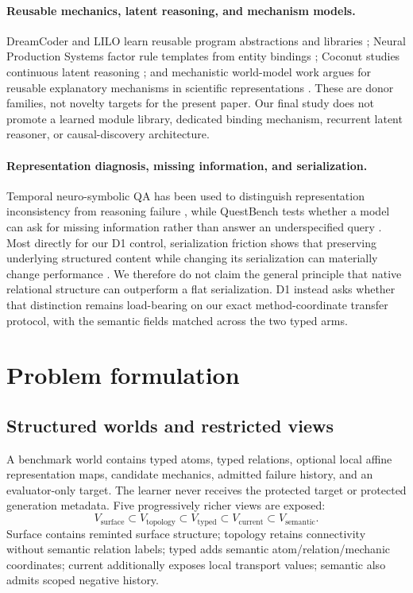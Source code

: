 \documentclass[10pt]{article}
\begin{document}
\paragraph{Reusable mechanics, latent reasoning, and mechanism models.}
DreamCoder and LILO learn reusable program abstractions and libraries \citep{ellis2020dreamcoder,grand2023lilo}; Neural Production Systems factor rule templates from entity bindings \citep{goyal2021nps}; Coconut studies continuous latent reasoning \citep{hao2024coconut}; and mechanistic world-model work argues for reusable explanatory mechanisms in scientific representations \citep{posner2026mwm}. These are donor families, not novelty targets for the present paper. Our final study does not promote a learned module library, dedicated binding mechanism, recurrent latent reasoner, or causal-discovery architecture.

\paragraph{Representation diagnosis, missing information, and serialization.}
Temporal neuro-symbolic QA has been used to distinguish representation inconsistency from reasoning failure \citep{liem2026temporal}, while QuestBench tests whether a model can ask for missing information rather than answer an underspecified query \citep{li2025questbench}. Most directly for our D1 control, serialization friction shows that preserving underlying structured content while changing its serialization can materially change performance \citep{lo2026serialization}. We therefore do not claim the general principle that native relational structure can outperform a flat serialization. D1 instead asks whether that distinction remains load-bearing on our exact method-coordinate transfer protocol, with the semantic fields matched across the two typed arms.

\section{Problem formulation}

\subsection{Structured worlds and restricted views}

A benchmark world contains typed atoms, typed relations, optional local affine representation maps, candidate mechanics, admitted failure history, and an evaluator-only target. The learner never receives the protected target or protected generation metadata. Five progressively richer views are exposed:
\[
V_{\mathrm{surface}} \subset V_{\mathrm{topology}} \subset V_{\mathrm{typed}}
\subset V_{\mathrm{current}} \subset V_{\mathrm{semantic}}.
\]
Surface contains reminted surface structure; topology retains connectivity without semantic relation labels; typed adds semantic atom/relation/mechanic coordinates; current additionally exposes local transport values; semantic also admits scoped negative history.
\end{document}
